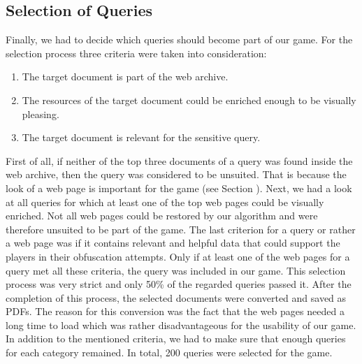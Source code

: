 \subsection{Selection of Queries}
Finally, we had to decide which queries should become part of our game. For the selection process three criteria were taken into consideration:
\begin{enumerate}
    \item The target document is part of the web archive.
    \item The resources of the target document could be enriched enough to be visually pleasing.
    \item The target document is relevant for the sensitive query.
\end{enumerate}
First of all, if neither of the top three documents of a query was found inside the web archive, then the query was considered to be unsuited. That is because the look of a web page is important for the game (see Section ). Next, we had a look at all queries for which at least one of the top web pages could be visually enriched. Not all web pages could be restored by our algorithm and were therefore unsuited to be part of the game. The last criterion for a query or rather a web page was if it contains relevant and helpful data that could support the players in their obfuscation attempts. Only if at least one of the web pages for a query met all these criteria, the query was included in our game. This selection process was very strict and only 50\% of the regarded queries passed it. After the completion of this process, the selected documents were converted and saved as PDFs. The reason for this conversion was the fact that the web pages needed a long time to load which was rather disadvantageous for the usability of our game. In addition to the mentioned criteria, we had to make sure that enough queries for each category remained. In total, 200 queries were selected for the game.

